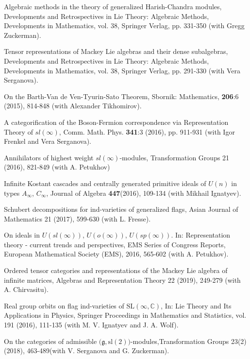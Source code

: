 \documentclass[11pt]{amsart}
\begin{document}
\myss \label{60.} Algebraic methods in the theory of generalized Harish-Chandra modules, Developments and Retrospectives in Lie Theory: Algebraic Methods, Developments in Mathematics, vol. 38, Springer Verlag, pp. 331-350 (with Gregg Zuckerman).

\myss \label{61.} Tensor representations of Mackey Lie algebras and their dense subalgebras, Developments and Retrospectives in Lie Theory: Algebraic Methods, Developments in Mathematics, vol. 38, Springer Verlag, pp. 291-330 (with Vera Serganova).

\myss \label{62.} On the Barth-Van de Ven-Tyurin-Sato Theorem, Sbornik: Mathematics, \textbf{206}:6 (2015), 814-848 (with Alexander Tikhomirov).

\myss \label{63.} A categorification of the Boson-Fermion correspondence via Representation Theory of $sl(\infty)$,  Comm. Math. Phys. \textbf{341}:3 (2016), pp. 911-931 (with Igor Frenkel and Vera Serganova).

\myss \label{64.} Annihilators of highest weight $sl(\infty)$-modules, Transformation Groups 21 (2016), 821-849 (with A. Petukhov)

\myss \label{65.} Infinite Kostant cascades and centrally generated primitive ideals of $U(n)$ in types $A_\infty$, $C_\infty$, Journal of Algebra \textbf{447}(2016), 109-134 (with Mikhail Ignatyev).

\myss \label{66.} Schubert decompositions for ind-varieties of generalized flags, Asian Journal of Mathematics 21 (2017), 599-630 (with L. Fresse).

\myss \label{67.} On ideals in $U(sl(\infty))$, $U(o(\infty))$, $U(sp(\infty))$. In: Representation theory - current trends and perspectives, EMS Series of Congress Reports, European Mathematical Society (EMS), 2016, 565-602 (with A. Petukhov). 

\myss \label{68.} Ordered tensor categories and representations of the Mackey Lie
algebra of infinite matrices, Algebras and Representation Theory 22 (2019), 249-279 (with A. Chirvasitu).

\myss \label{69.} Real group orbits on flag ind-varieties of $\mathrm{SL}(\infty,\mathbb{C})$, In: Lie Theory and Its Applications in Physics, Springer Proceedings in Mathematics and Statistics, vol. 191 (2016), 111-135 (with M. V. Ignatyev and J. A. Wolf).

\myss \label{70.}  On the categories of admissible $\big(\mathfrak{g},\mathrm{sl}(2)\big)$-modules,Transformation Groups 23(2) (2018), 463-489(with V. Serganova and G. Zuckerman).
\end{document}
